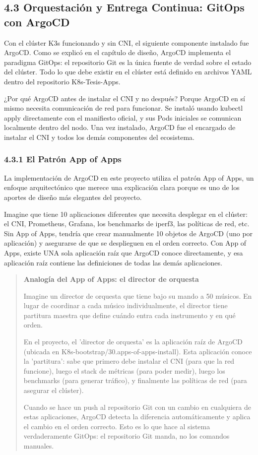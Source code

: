 \documentclass[journal]{IEEEtran}
\begin{document}
\subsection{4.3 Orquestación y Entrega Continua: GitOps con ArgoCD}

Con el clúster K3s funcionando y sin CNI, el siguiente componente instalado fue ArgoCD. Como se explicó en el capítulo de diseño, ArgoCD implementa el paradigma GitOps: el repositorio Git es la única fuente de verdad sobre el estado del clúster. Todo lo que debe existir en el clúster está definido en archivos YAML dentro del repositorio K8s-Tesis-Apps.

¿Por qué ArgoCD antes de instalar el CNI y no después? Porque ArgoCD en sí mismo necesita comunicación de red para funcionar. Se instaló usando kubectl apply directamente con el manifiesto oficial, y sus Pods iniciales se comunican localmente dentro del nodo. Una vez instalado, ArgoCD fue el encargado de instalar el CNI y todos los demás componentes del ecosistema.

\subsubsection{4.3.1 El Patrón App of Apps}

La implementación de ArgoCD en este proyecto utiliza el patrón App of Apps, un enfoque arquitectónico que merece una explicación clara porque es uno de los aportes de diseño más elegantes del proyecto.

Imagine que tiene 10 aplicaciones diferentes que necesita desplegar en el clúster: el CNI, Prometheus, Grafana, los benchmarks de iperf3, las políticas de red, etc. Sin App of Apps, tendría que crear manualmente 10 objetos de ArgoCD (uno por aplicación) y asegurarse de que se desplieguen en el orden correcto. Con App of Apps, existe UNA sola aplicación raíz que ArgoCD conoce directamente, y esa aplicación raíz contiene las definiciones de todas las demás aplicaciones.

\begin{quote}
\textbf{Analogía del App of Apps: el director de orquesta}

Imagine un director de orquesta que tiene bajo su mando a 50 músicos. En lugar de coordinar a cada músico individualmente, el director tiene partitura maestra que define cuándo entra cada instrumento y en qué orden.

En el proyecto, el 'director de orquesta' es la aplicación raíz de ArgoCD (ubicada en K8s-bootstrap/30.apps-of-apps-install). Esta aplicación conoce la 'partitura': sabe que primero debe instalar el CNI (para que la red funcione), luego el stack de métricas (para poder medir), luego los benchmarks (para generar tráfico), y finalmente las políticas de red (para asegurar el clúster).

Cuando se hace un push al repositorio Git con un cambio en cualquiera de estas aplicaciones, ArgoCD detecta la diferencia automáticamente y aplica el cambio en el orden correcto. Esto es lo que hace al sistema verdaderamente GitOps: el repositorio Git manda, no los comandos manuales.
\end{quote}
\end{document}
